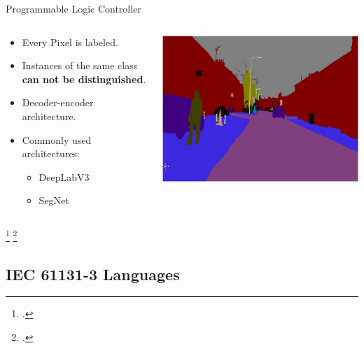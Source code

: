 \documentclass[18pt]{beamer}
\begin{document}
\begin{frame}{Programmable Logic Controller}
\begin{columns}
    \begin{column}{0.5\textwidth}
        \begin{itemize}
            \item Every Pixel is labeled.
            \item Instances of the same class \textbf{can not be distinguished}.
            \item Decoder-encoder architecture.
            \item Commonly used architectures:
            \begin{itemize}
                \item DeepLabV3~\footnotemark
                
                \item SegNet~\footnotemark
                
            \end{itemize}
        \end{itemize}
    \end{column}
    \begin{column}{0.5\textwidth}
        \includegraphics[width=\textwidth]{figures/segnet_example.png}
    \end{column}
\end{columns}
\footcitetext{DBLP:journals/corr/abs-1802-02611}
\footcitetext{DBLP:journals/corr/BadrinarayananK15}
\end{frame}

\subsection{IEC 61131-3 Languages}
\end{document}
